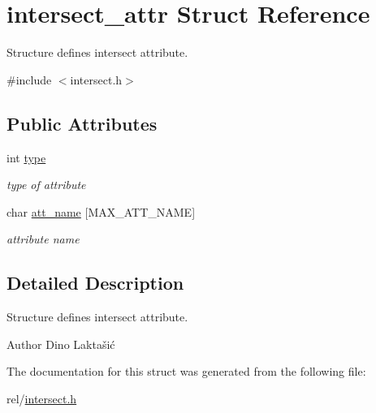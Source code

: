 \hypertarget{structintersect__attr}{\section{intersect\+\_\+attr Struct Reference}
\label{structintersect__attr}
}


Structure defines intersect attribute.  




{\ttfamily \#include $<$intersect.\+h$>$}

\subsection*{Public Attributes}
\begin{DoxyCompactItemize}
\item 
\hypertarget{structintersect__attr_a309cf5c27cb6bad9d421e0cec60a733f}{int \hyperlink{structintersect__attr_a309cf5c27cb6bad9d421e0cec60a733f}{type}}\label{structintersect__attr_a309cf5c27cb6bad9d421e0cec60a733f}

\begin{DoxyCompactList}\small\item\em type of attribute \end{DoxyCompactList}\item 
\hypertarget{structintersect__attr_a2def8cfafc023b1052438588af1d38b1}{char \hyperlink{structintersect__attr_a2def8cfafc023b1052438588af1d38b1}{att\+\_\+name} \mbox{[}M\+A\+X\+\_\+\+A\+T\+T\+\_\+\+N\+A\+M\+E\mbox{]}}\label{structintersect__attr_a2def8cfafc023b1052438588af1d38b1}

\begin{DoxyCompactList}\small\item\em attribute name \end{DoxyCompactList}\end{DoxyCompactItemize}


\subsection{Detailed Description}
Structure defines intersect attribute. 

\begin{DoxyAuthor}{Author}
Dino Laktašić 
\end{DoxyAuthor}


The documentation for this struct was generated from the following file\+:\begin{DoxyCompactItemize}
\item 
rel/\hyperlink{intersect_8h}{intersect.\+h}\end{DoxyCompactItemize}
